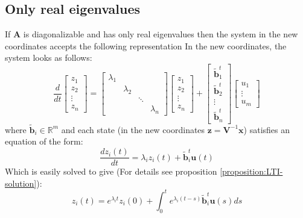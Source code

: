 \documentclass[a4paper,10pt,oneside]{book}
\begin{document}
\subsection{Only real eigenvalues}
If $\mathbf{A}$ is diagonalizable and has only real eigenvalues then the system in the new coordinates accepts the following representation
In the new coordinates, the system looks as follows:
\begin{equation}
 \frac{d}{dt}\left[ {\begin{array}{c}
 z_1 \\
 z_2 \\
 \vdots  \\
 z_n
 \end{array} } \right] = 
\left[ {\begin{array}{cccc}
 \lambda_1 & & & \\
 & \lambda_2 & & \\
 & & \ddots & \\
 & & & \lambda_n
 \end{array} } \right]
\left[ {\begin{array}{c}
 z_1 \\
 z_2 \\
 \vdots  \\
 z_n
 \end{array} } \right]+
\left[ {\begin{array}{c}
 \tilde{\mathbf{b}}^t_1 \\
 \tilde{\mathbf{b}}^t_2 \\
 \vdots  \\
 \tilde{\mathbf{b}}^t_n
 \end{array} } \right]
 \left[ {\begin{array}{c}
 u_1 \\
 \vdots  \\
 u_m
 \end{array} } \right]
\end{equation} 
where $\tilde{\mathbf{b}}_i \in \mathbb{R}^m$ and each state (in the new coordinates $\mathbf{z}=\mathbf{V}^{-1}\mathbf{x}$) satisfies an equation of the form:
\begin{equation}
 \frac{dz_i(t)}{dt} = \lambda_i z_i(t) + \tilde{\mathbf{b}}^t_i \mathbf{u}(t) 
\end{equation}
Which is easily solved to give (For details see proposition \ref{proposition:LTI-solution}):
\begin{equation}\label{DDF54}
 z_i(t) = e^{\lambda_i t}z_i(0) + \int_{0}^{t}e^{\lambda_i(t-s)}\tilde{\mathbf{b}}^t_i \mathbf{u}(s) ds
\end{equation}
\end{document}

